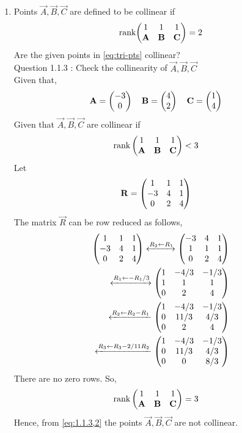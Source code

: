 \documentclass[11pt]{book}
\begin{document}
\begin{enumerate}[label=\thesection.\arabic*.,ref=\thesection.\theenumi]
\item   Points $\vec{A}, \vec{B}, \vec{C}$ are defined to be collinear if 
		\begin{align}
			\text{rank}{\ensuremath{\begin{pmatrix}1 & 1 & 1 \\ \mathbf{A}& \mathbf{B}&\mathbf{C}\end{pmatrix}}} = 2
		\end{align}
Are the given points in
			\eqref{eq:tri-pts}
collinear?\\
Question 1.1.3 : Check the collinearity of $\vec{A},\vec{B},\vec{C}$ \\ 
\solution 
Given that,
\begin{align}
    \mathbf{A} = \begin{pmatrix}-3\\0\end{pmatrix}
    \quad
    \mathbf{B} &= \begin{pmatrix}4\\2\end{pmatrix}
    \quad
    \mathbf{C} = \begin{pmatrix}1\\4\end{pmatrix}
\end{align}
Given that $\vec{A},\vec{B},\vec{C}$ are collinear if
\begin{align}
    \text{rank}\myvec{
    1 & 1 &1\\
    \vec{A} & \vec{B} & \vec{C} \\
    } &< 3 
    \label{eq:1.1.3,2}
\end{align} 
Let
\begin{align}
    \mathbf{R}&=\begin{pmatrix}
    1 & 1 & 1
    \\
    -3& 4 & 1
    \\
    0 & 2 & 4
    \end{pmatrix} 
\end{align} 
The matrix $\vec{R}$ can be row reduced as follows,
\begin{align}
    \label{eq:matthrowoperations}
    \myvec{
    1 & 1 & 1
    \\
    -3 & 4 & 1
    \\
    0 & 2 & 4
    }
     \xleftrightarrow[]{R_2 \leftarrow R_1}
    \myvec{
    -3 & 4 & 1
    \\
    1 & 1 & 1
    \\
    0 & 2 & 4
    }
    \\
     \xleftrightarrow[]{R_1\leftarrow -R_1/3}
    \myvec{
    1 & -4/3 & -1/3
    \\
    1 & 1 & 1
    \\
    0 & 2 & 4 
    }
    \\
    \xleftarrow[]{R_2\leftarrow R_2-R_1}
    \myvec{
    1 & -4/3 & -1/3
    \\
    0 & 11/3 & 4/3
    \\
    0 & 2 & 4
    }
    \\
    \xleftarrow[]{R_3\leftarrow R_3-2/11R_2}
    \myvec{
    1&-4/3&-1/3
    \\
    0&11/3&4/3
    \\
    0&0&8/3
    }
\end{align}
There are no zero rows. So,
\begin{align}
    \text{rank}\begin{pmatrix}
    1 & 1 & 1\\
    \mathbf{A} & \mathbf{B} & \mathbf{C} \\
    \end{pmatrix} &= 3 
\end{align}  
Hence, from \eqref{eq:1.1.3,2} the points $\vec{A},\vec{B},\vec{C}$ are not collinear. 


\end{enumerate}
\end{document}
